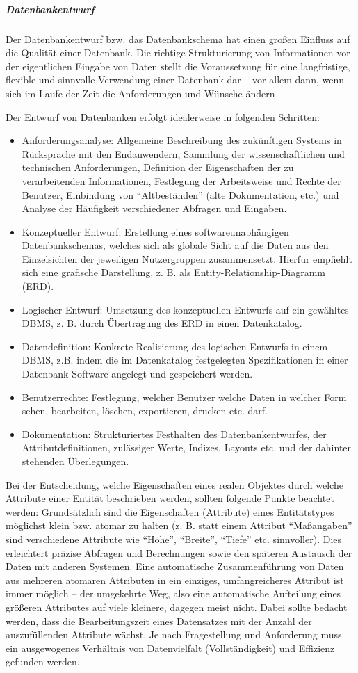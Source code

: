\subparagraph{Datenbankentwurf}
Der Datenbankentwurf bzw. das Datenbankschema hat einen großen Einfluss auf die  Qualität einer Datenbank. Die richtige Strukturierung von Informationen vor der eigentlichen Eingabe von Daten stellt die Voraussetzung für eine langfristige, flexible und sinnvolle Verwendung einer Datenbank dar -- vor allem dann, wenn sich im Laufe der Zeit die Anforderungen und Wünsche ändern

Der Entwurf von Datenbanken erfolgt idealerweise in folgenden Schritten:
\begin{itemize}
	\item Anforderungsanalyse: Allgemeine Beschreibung des zukünftigen Systems in Rücksprache mit den Endanwendern, Sammlung der wissenschaftlichen und technischen Anforderungen, Definition der Eigenschaften der zu verarbeitenden Informationen, Festlegung der Arbeitsweise und Rechte der Benutzer, Einbindung von "`Altbeständen"' (alte Dokumentation, etc.) und Analyse der Häufigkeit verschiedener Abfragen und Eingaben.
	\item Konzeptueller Entwurf: Erstellung eines softwareunabhängigen Datenbankschemas, welches sich als globale Sicht auf die Daten aus den Einzelsichten der jeweiligen Nutzergruppen zusammensetzt. Hierfür empfiehlt sich eine grafische Darstellung, z. B. als Entity-Relationship-Diagramm (ERD). 
	\item Logischer Entwurf: Umsetzung des konzeptuellen Entwurfs auf ein gewähltes DBMS, z. B. durch Übertragung des ERD in einen Datenkatalog.
	\item Datendefinition: Konkrete Realisierung des logischen Entwurfs in einem DBMS, z.B. indem die im Datenkatalog festgelegten Spezifikationen in einer Datenbank-Software angelegt und gespeichert werden.
	\item Benutzerrechte: Festlegung, welcher Benutzer welche Daten in welcher Form sehen, bearbeiten, löschen, exportieren, drucken etc. darf.
	\item Dokumentation: Strukturiertes Festhalten des Datenbankentwurfes, der Attributdefinitionen, zulässiger Werte, Indizes, Layouts etc. und der dahinter stehenden Überlegungen. 
\end{itemize}

Bei der Entscheidung, welche Eigenschaften eines realen Objektes durch welche Attribute einer Entität beschrieben werden, sollten folgende Punkte beachtet werden: Grundsätzlich sind die Eigenschaften (Attribute) eines Entitätstypes möglichst klein bzw. atomar zu halten (z. B. statt einem Attribut "`Maßangaben"' sind verschiedene Attribute wie "`Höhe"', "`Breite"', "`Tiefe"' etc. sinnvoller). Dies erleichtert präzise Abfragen und Berechnungen sowie den späteren Austausch der Daten mit anderen Systemen. Eine automatische Zusammenführung von Daten aus mehreren atomaren Attributen in ein einziges, umfangreicheres Attribut  ist immer möglich -- der umgekehrte Weg, also eine automatische Aufteilung eines größeren Attributes auf viele kleinere, dagegen meist nicht. Dabei sollte bedacht werden, dass die Bearbeitungszeit eines Datensatzes mit der Anzahl der auszufüllenden Attribute wächst. Je nach Fragestellung und Anforderung muss ein ausgewogenes Verhältnis von Datenvielfalt (Vollständigkeit) und Effizienz gefunden werden.

